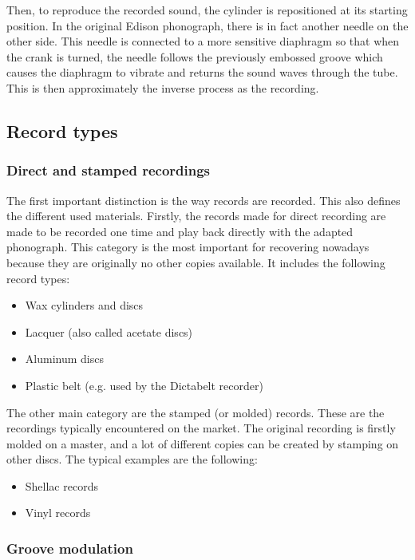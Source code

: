 Then, to reproduce the recorded sound, the cylinder is repositioned at its starting position. In the original Edison phonograph, there is in fact another needle on the other side. This needle is connected to a more sensitive diaphragm so that when the crank is turned, the needle follows the previously embossed groove which causes the diaphragm to vibrate and returns the sound waves through the tube. This is then approximately the inverse process as the recording.

\subsection{Record types}
\label{sec:rectypes}

\subsubsection{Direct and stamped recordings}

The first important distinction is the way records are recorded. This also defines the different used materials. Firstly, the records made for direct recording are made to be recorded one time and play back directly with the adapted phonograph. This category is the most important for recovering nowadays because they are originally no other copies available. It includes the following record types:

\begin{itemize}
\item Wax cylinders and discs
\item Lacquer (also called acetate discs)
\item Aluminum discs
\item Plastic belt (e.g. used by the Dictabelt recorder)
\end{itemize}

The other main category are the stamped (or molded) records. These are the recordings typically encountered on the market. The original recording is firstly molded on a master, and a lot of different copies can be created by stamping on other discs. The typical examples are the following:

\begin{itemize}
\item Shellac records
\item Vinyl records
\end{itemize}

\subsubsection{Groove modulation}


